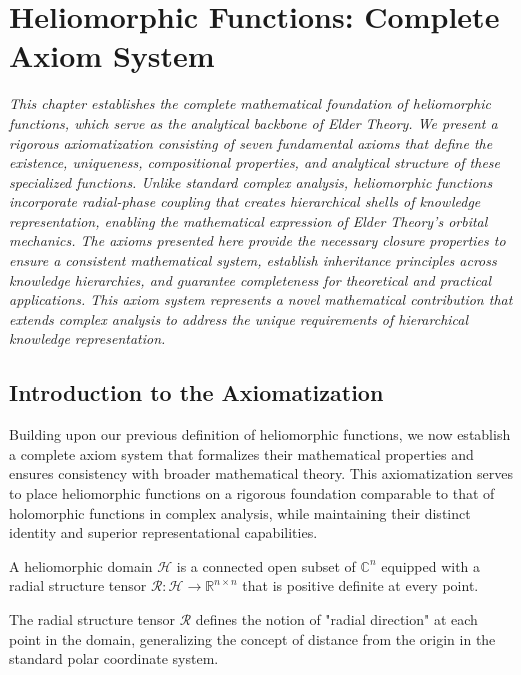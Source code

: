 \chapter{Heliomorphic Functions: Complete Axiom System}

\textit{This chapter establishes the complete mathematical foundation of heliomorphic functions, which serve as the analytical backbone of Elder Theory. We present a rigorous axiomatization consisting of seven fundamental axioms that define the existence, uniqueness, compositional properties, and analytical structure of these specialized functions. Unlike standard complex analysis, heliomorphic functions incorporate radial-phase coupling that creates hierarchical shells of knowledge representation, enabling the mathematical expression of Elder Theory's orbital mechanics. The axioms presented here provide the necessary closure properties to ensure a consistent mathematical system, establish inheritance principles across knowledge hierarchies, and guarantee completeness for theoretical and practical applications. This axiom system represents a novel mathematical contribution that extends complex analysis to address the unique requirements of hierarchical knowledge representation.}

\section{Introduction to the Axiomatization}

Building upon our previous definition of heliomorphic functions, we now establish a complete axiom system that formalizes their mathematical properties and ensures consistency with broader mathematical theory. This axiomatization serves to place heliomorphic functions on a rigorous foundation comparable to that of holomorphic functions in complex analysis, while maintaining their distinct identity and superior representational capabilities.

\begin{definition}
A heliomorphic domain $\mathcal{H}$ is a connected open subset of $\mathbb{C}^n$ equipped with a radial structure tensor $\mathcal{R}: \mathcal{H} \rightarrow \mathbb{R}^{n \times n}$ that is positive definite at every point.
\end{definition}

The radial structure tensor $\mathcal{R}$ defines the notion of "radial direction" at each point in the domain, generalizing the concept of distance from the origin in the standard polar coordinate system.

